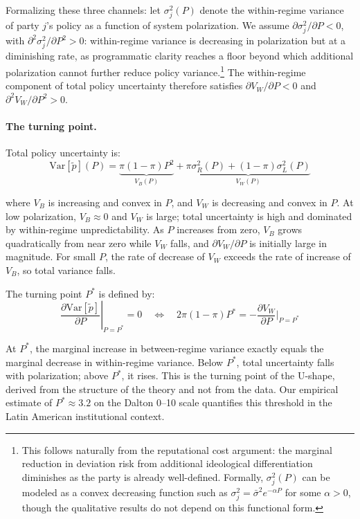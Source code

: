 \documentclass[12pt]{article}
\begin{document}
Formalizing these three channels: let $\sigma_j^2(P)$ denote
the within-regime variance of party $j$'s policy as a function of system
polarization. We assume $\partial \sigma_j^2 / \partial P < 0$, with
$\partial^2 \sigma_j^2 / \partial P^2 > 0$: within-regime variance is
decreasing in polarization but at a diminishing rate, as programmatic
clarity reaches a floor beyond which additional polarization cannot further
reduce policy variance.\footnote{This follows naturally from the reputational
cost argument: the marginal reduction in deviation risk from additional
ideological differentiation diminishes as the party is already well-defined.
Formally, $\sigma_j^2(P)$ can be modeled as a convex decreasing function such
as $\sigma_j^2 = \bar{\sigma}^2 e^{-\alpha P}$ for some $\alpha > 0$, though
the qualitative results do not depend on this functional form.} The
within-regime component of total policy uncertainty therefore satisfies
$\partial V_W / \partial P < 0$ and $\partial^2 V_W / \partial P^2 > 0$.

\paragraph{The turning point.} Total policy uncertainty is:
\begin{equation}
\label{eq:total}
\text{Var}[\tilde{p}](P) = \underbrace{\pi(1-\pi)P^2}_{V_B(P)} +
\underbrace{\pi\sigma_R^2(P) + (1-\pi)\sigma_L^2(P)}_{V_W(P)}
\end{equation}

\noindent where $V_B$ is increasing and convex in $P$, and $V_W$ is
decreasing and convex in $P$. At low polarization, $V_B \approx 0$ and
$V_W$ is large; total uncertainty is high and dominated by within-regime
unpredictability. As $P$ increases from zero, $V_B$ grows quadratically
from near zero while $V_W$ falls, and $\partial V_W / \partial P$ is
initially large in magnitude. For small $P$, the rate of decrease of
$V_W$ exceeds the rate of increase of $V_B$, so total variance falls.

The turning point $P^*$ is defined by:
\begin{equation}
\label{eq:turning}
\left.\frac{\partial \text{Var}[\tilde{p}]}{\partial P}\right|_{P=P^*} = 0
\quad\Longleftrightarrow\quad
2\pi(1-\pi)P^* = -\frac{\partial V_W}{\partial P}\bigg|_{P=P^*}
\end{equation}

\noindent At $P^*$, the marginal increase in between-regime variance exactly
equals the marginal decrease in within-regime variance. Below $P^*$, total
uncertainty falls with polarization; above $P^*$, it rises. This is the
turning point of the U-shape, derived from the structure of the theory and
not from the data. Our empirical estimate of $P^* \approx 3.2$ on the
Dalton 0--10 scale quantifies this threshold in the Latin American
institutional context.
\end{document}
